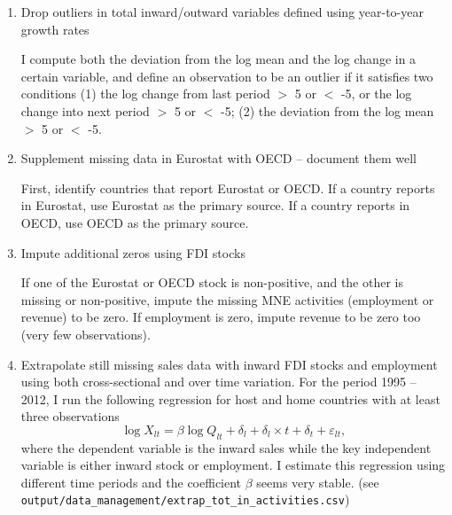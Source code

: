 \documentclass[notitlepage,11pt]{article}%
\begin{document}
\begin{enumerate}
\item Drop outliers in total inward/outward variables defined using
year-to-year growth rates

I compute both the deviation from the log mean and the log change in a certain
variable, and define an observation to be an outlier if it satisfies two
conditions (1) the log change from last period
$>$
5 or
$<$
-5, or the log change into next period
$>$%
5 or
$<$
-5; (2) the deviation from the log mean
$>$
5 or
$<$
-5.

\item Supplement missing data in Eurostat with OECD -- document them well

First, identify countries that report Eurostat or OECD. If a country reports
in Eurostat, use Eurostat as the primary source. If a country reports in OECD,
use OECD as the primary source.

\item Impute additional zeros using FDI stocks

If one of the Eurostat or OECD stock is non-positive, and the other is missing
or non-positive, impute the missing MNE activities (employment or revenue) to
be zero. If employment is zero, impute revenue to be zero too (very few observations).

\item Extrapolate still missing sales data with inward FDI stocks and
employment using both cross-sectional and over time variation. For the period
1995 -- 2012, I run the following regression for host and home countries with
at least three observations%
\[
\log X_{lt}=\beta\log Q_{lt}+\delta_{l}+\delta_{l}\times t+\delta
_{t}+\varepsilon_{lt},
\]
where the dependent variable is the inward sales while the key independent
variable is either inward stock or employment. I estimate this regression
using different time periods and the coefficient $\beta$ seems very stable.
(see \texttt{output/data\_management/extrap\_tot\_in\_activities.csv})


\end{enumerate}
\end{document}
